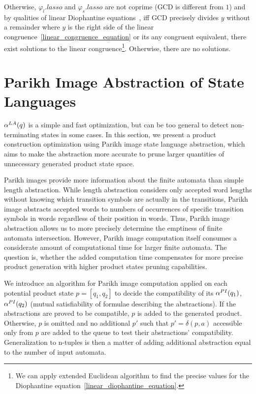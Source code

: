 Otherwise, $\varphi_l.lasso$ and $\varphi_s.lasso$ are not coprime (GCD is different from $1$) and by qualities of linear Diophantine equations~\cite{LinearCongruences}, iff GCD precisely divides $y$ without a remainder where $y$ is the right side of the linear congruence~\ref{linear_congruence_equation} or its any congruent equivalent, there exist solutions to the linear congruence\footnote{We can apply extended Euclidean algorithm to find the precise values for the Diophantine equation~\ref{linear_diophantine_equation}.}. Otherwise, there are no solutions.

\section{Parikh Image Abstraction of State Languages}

$\alpha^{LA}(q)$ is a simple and fast optimization, but can be too general to detect non-terminating states in some cases. In this section, we present a product construction optimization using Parikh image state language abstraction, which aims to make the abstraction more accurate to prune larger quantities of unnecessary generated product state space.

Parikh images provide more information about the finite automata than simple length abstraction. While length abstraction considers only accepted word lengths without knowing which transition symbols are actually in the transitions, Parikh image abstracts accepted words to numbers of occurrences of specific transition symbols in words regardless of their position in words. Thus, Parikh image abstraction allows us to more precisely determine the emptiness of finite automata intersection. However, Parikh image computation itself consumes a considerate amount of computational time for larger finite automata. The question is, whether the added computation time compensates for more precise product generation with higher product states pruning capabilities.

We introduce an algorithm for Parikh image computation applied on each potential product state $p = [q_1, q_2]$ to decide the compatibility of its $\alpha^{PI}(q_1)$, $\alpha^{PI}(q_2)$ (mutual satisfiability of formulae describing the abstractions). If the abstractions are proved to be compatible, $p$ is added to the generated product. Otherwise, $p$ is omitted and no additional $p'$ such that $p' = \delta(p, a)$ accessible only from $p$ are added to the queue to test their abstractions' compatibility. Generalization to n-tuples is then a matter of adding additional abstraction equal to the number of input automata.

